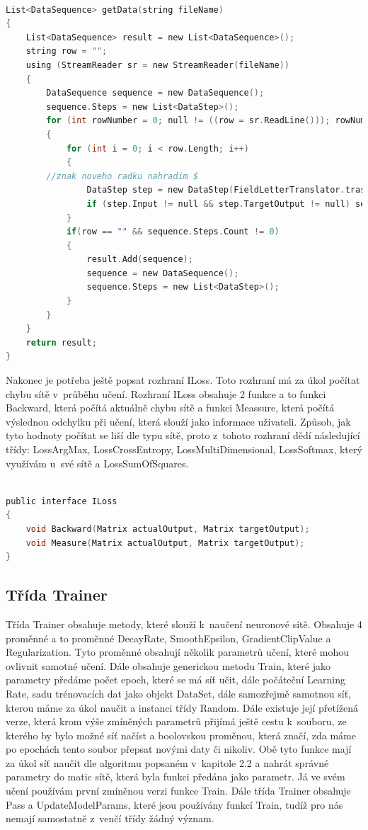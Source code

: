 \documentclass[a4paper]{article}
\begin{document}
\begin{lstlisting}[language=c, title={Ukázka funkce getData}]

List<DataSequence> getData(string fileName)
{
    List<DataSequence> result = new List<DataSequence>();
    string row = "";
    using (StreamReader sr = new StreamReader(fileName))
    {
        DataSequence sequence = new DataSequence();
        sequence.Steps = new List<DataStep>();
        for (int rowNumber = 0; null != ((row = sr.ReadLine())); rowNumber++ )
        {
            for (int i = 0; i < row.Length; i++)
            {
		//znak noveho radku nahradim $    
                DataStep step = new DataStep(FieldLetterTranslator.traslateToField(row[i]), FieldLetterTranslator.traslateToField((i + 1 < row.Length) ? row[i + 1] : '$'));
                if (step.Input != null && step.TargetOutput != null) sequence.Steps.Add(step);
            }
            if(row == "" && sequence.Steps.Count != 0)
            {
                result.Add(sequence);
                sequence = new DataSequence();
                sequence.Steps = new List<DataStep>();
            }
        }
    }
    return result;
}
\end{lstlisting}
Nakonec je potřeba ještě popsat rozhraní ILoss. Toto rozhraní má za úkol počítat chybu sítě v~průběhu učení. Rozhraní ILoss obsahuje 2 funkce a to funkci Backward, která počítá aktuálně chybu sítě a funkci Meassure, která počítá výslednou odchylku při učení, která slouží jako informace uživateli. Způsob, jak tyto hodnoty počítat se liší dle typu sítě, proto z~tohoto rozhraní dědí následující třídy: LossArgMax, LossCrossEntropy, LossMultiDimensional, LossSoftmax, který využívám u~své sítě a LossSumOfSquares.
\begin{lstlisting}[language=c, title={ukázka rozhraní ILoss}]

public interface ILoss
{
    void Backward(Matrix actualOutput, Matrix targetOutput);
    void Measure(Matrix actualOutput, Matrix targetOutput);
}
\end{lstlisting}
\subsection{Třída Trainer}
Třída Trainer obsahuje metody, které slouží k~naučení neuronové sítě. Obsahuje 4 proměnné a to proměnné DecayRate, SmoothEpsilon, GradientClipValue a Regularization. Tyto proměnné obsahují několik parametrů učení, které mohou ovlivnit samotné učení. Dále obsahuje generickou metodu Train, které jako parametry předáme počet epoch, které se má síť učit, dále počáteční Learning Rate, sadu trénovacích dat jako objekt DataSet, dále samozřejmě samotnou síť, kterou máme za úkol naučit a instanci třídy Random. Dále existuje její přetížená verze, která krom výše zmíněných parametrů přijímá ještě cestu k~souboru, ze kterého by bylo možné síť načíst a boolovskou proměnou, která značí, zda máme po epochách tento soubor přepsat novými daty či nikoliv. Obě tyto funkce mají za úkol síť naučit dle algoritmu popsaném v~kapitole 2.2 a nahrát správné parametry do matic sítě, která byla funkci předána jako parametr. Já ve svém učení používám první zmíněnou verzi funkce Train. Dále třída Trainer obsahuje Pass a UpdateModelParams, které jsou používány funkcí Train, tudíž pro nás nemají samostatně z~venčí třídy žádný význam. 
\end{document}
